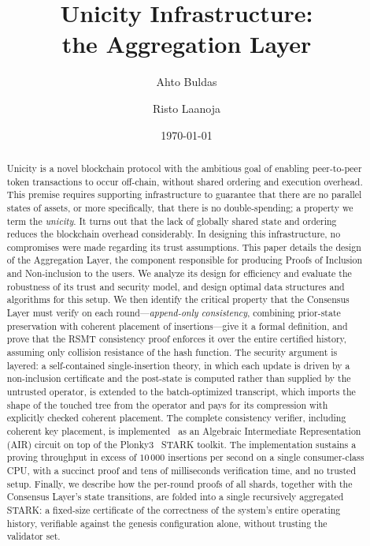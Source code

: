 \documentclass[11pt]{article}
\title{Unicity Infrastructure:\\
    the Aggregation Layer}
\author[1]{Ahto Buldas}
\author[2]{Risto Laanoja}
\affil[1]{Tallinn University of Technology}
\affil[2]{Unicity Labs}
\date{\today}
\begin{document}
\maketitle

\begin{abstract}
Unicity is a novel blockchain protocol with the ambitious goal of enabling peer-to-peer token transactions to occur off-chain, without shared ordering and execution overhead. This premise requires supporting infrastructure to guarantee that there are no parallel states of assets, or more specifically, that there is no double-spending; a property we term the \textit{unicity}. It turns out that the lack of globally shared state and ordering reduces the blockchain overhead considerably. In designing this infrastructure, no compromises were made regarding its trust assumptions. This paper details the design of the Aggregation Layer, the component responsible for producing Proofs of Inclusion and Non-inclusion to the users. We analyze its design for efficiency and evaluate the robustness of its trust and security model, and design optimal data structures and algorithms for this setup. We then identify the critical property that the Consensus Layer must verify on each round---\emph{append-only consistency}, combining prior-state preservation with coherent placement of insertions---give it a formal definition, and prove that the RSMT consistency proof enforces it over the entire certified history, assuming only collision resistance of the hash function. The security argument is layered: a self-contained single-insertion theory, in which each update is driven by a non-inclusion certificate and the post-state is computed rather than supplied by the untrusted operator, is extended to the batch-optimized transcript, which imports the shape of the touched tree from the operator and pays for its compression with explicitly checked coherent placement. The complete consistency verifier, including coherent key placement, is implemented~\cite{rsmtair} as an Algebraic Intermediate Representation (AIR) circuit on top of the Plonky3~\cite{plonky3} STARK toolkit. The implementation sustains a proving throughput in excess of $10\,000$ insertions per second on a single consumer-class CPU, with a succinct proof and tens of milliseconds verification time, and no trusted setup. Finally, we describe how the per-round proofs of all shards, together with the Consensus Layer's state transitions, are folded into a single recursively aggregated STARK: a fixed-size certificate of the correctness of the system's entire operating history, verifiable against the genesis configuration alone, without trusting the validator set.
\end{abstract}
\end{document}

